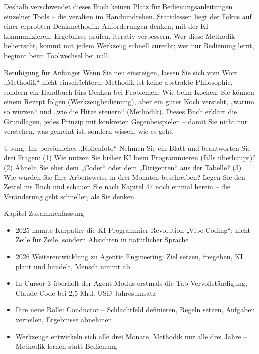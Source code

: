 Deshalb verschwendet dieses Buch keinen Platz für Bedienungsanleitungen einzelner Tools – die veralten im Handumdrehen. Stattdessen liegt der Fokus auf einer erprobten Denkmethodik: Anforderungen denken, mit der KI kommunizieren, Ergebnisse prüfen, iterativ verbessern. Wer diese Methodik beherrscht, kommt mit jedem Werkzeug schnell zurecht; wer nur Bedienung lernt, beginnt beim Toolwechsel bei null.

\begin{tcbinfo}{Beruhigung für Anfänger}
Wenn Sie neu einsteigen, lassen Sie sich vom Wort „Methodik“ nicht einschüchtern. Methodik ist keine abstrakte Philosophie, sondern ein Handbuch fürs Denken bei Problemen. Wie beim Kochen: Sie können einem Rezept folgen (Werkzeugbedienung), aber ein guter Koch versteht, „warum so würzen“ und „wie die Hitze steuern“ (Methodik). Dieses Buch erklärt die Grundlagen, jedes Prinzip mit konkreten Gegenbeispielen – damit Sie nicht nur verstehen, was gemeint ist, sondern wissen, wie es geht.

\end{tcbinfo}

\begin{tcbpractice}{Übung: Ihr persönliches „Rollenfoto“}
Nehmen Sie ein Blatt und beantworten Sie drei Fragen: (1) Wie nutzen Sie bisher KI beim Programmieren (falls überhaupt)? (2) Ähneln Sie eher dem „Coder“ oder dem „Dirigenten“ aus der Tabelle? (3) Wie würden Sie Ihre Arbeitsweise in drei Monaten beschreiben? Legen Sie den Zettel ins Buch und schauen Sie nach Kapitel 47 noch einmal herein – die Veränderung geht schneller, als Sie denken.

\end{tcbpractice}

\begin{tcbsummary}{Kapitel-Zusammenfassung}
\begin{itemize}
  \item 2025 nannte Karpathy die KI-Programmier-Revolution „Vibe Coding“: nicht Zeile für Zeile, sondern Absichten in natürlicher Sprache
  \item 2026 Weiterentwicklung zu Agentic Engineering: Ziel setzen, freigeben, KI plant und handelt, Mensch nimmt ab
  \item In Cursor 3 überholt der Agent-Modus erstmals die Tab-Vervollständigung; Claude Code bei 2,5 Mrd. USD Jahresumsatz
  \item Ihre neue Rolle: Conductor – Schlachtfeld definieren, Regeln setzen, Aufgaben verteilen, Ergebnisse abnehmen
  \item Werkzeuge entwickeln sich alle drei Monate, Methodik nur alle drei Jahre – Methodik lernen statt Bedienung
\end{itemize}

\end{tcbsummary}
